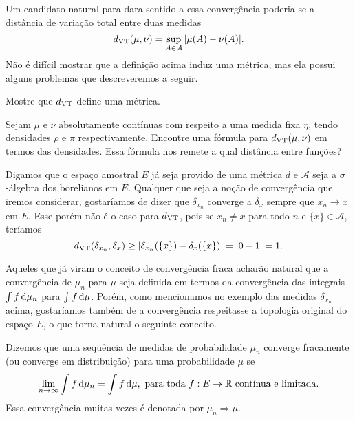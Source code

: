 Um candidato natural para dara sentido a essa convergência poderia se a distância de variação total entre duas medidas
\begin{equation}
  d_{\operatorname{VT}}(\mu,\nu) = \sup_{A \in \mathcal{A}} |\mu(A) - \nu(A)|.
\end{equation}
Não é difícil mostrar que a definição acima induz uma métrica, mas ela possui alguns problemas que descreveremos a seguir.

\begin{exercise}
  Mostre que $d_{\operatorname{VT}}$ define uma métrica.
\end{exercise}

\begin{exercise}
  Sejam $\mu$ e $\nu$ absolutamente contínuas com respeito a uma medida fixa $\eta$, tendo densidades $\rho$ e $\pi$ respectivamente.
  Encontre uma fórmula para $d_{\operatorname{VT}}(\mu, \nu)$ em termos das densidades.
  Essa fórmula nos remete a qual distância entre funções?
\end{exercise}

Digamos que o espaço amostral $E$ já seja provido de uma métrica $d$ e $\mathcal{A}$ seja a $\sigma$-álgebra dos borelianos em $E$.
Qualquer que seja a noção de convergência que iremos considerar, gostaríamos de dizer que $\delta_{x_n}$ converge a $\delta_x$ sempre que $x_n \to x$ em $E$.
Esse porém não é o caso para $d_{\operatorname{VT}}$, pois se $x_n \neq x$ para todo $n$ e $\{x\} \in \mathcal{A}$, teríamos
\begin{equation}
  d_{\operatorname{VT}}(\delta_{x_n}, \delta_x) \geq |\delta_{x_n}(\{x\}) - \delta_{x}(\{x\}) | = |0 - 1| = 1.
\end{equation}

Aqueles que já viram o conceito de convergência fraca acharão natural que a convergência de $\mu_n$ para $\mu$ seja definida em termos da convergência das integrais $\int f \mathop{}\!\mathrm{d} \mu_n$ para $\int f \mathop{}\!\mathrm{d} \mu$.
Porém, como mencionamos no exemplo das medidas $\delta_{x_n}$ acima, gostaríamos também de a convergência respeitasse a topologia original do espaço $E$, o que torna natural o seguinte conceito.

\begin{definition}
  Dizemos que uma sequência de medidas de probabilidade $\mu_n$ converge fracamente (ou converge em distribuição) para uma probabilidade $\mu$ se 
  \begin{equation}
    \lim_{n \to \infty} \int f \mathop{}\!\mathrm{d} \mu_n = \int f \mathop{}\!\mathrm{d} \mu, \text{ para toda $f:E \to \mathbb{R}$ contínua e limitada.}
  \end{equation}
  Essa convergência muitas vezes é denotada por $\mu_n \Rightarrow \mu$.
\end{definition}

